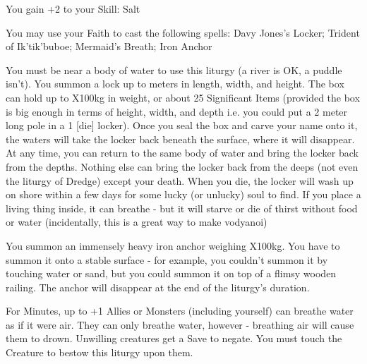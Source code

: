 {

You gain +2 to your Skill: Salt


You may use your Faith to cast the following spells: Davy Jones's Locker; Trident of Ik'tik'buboe; Mermaid's Breath; Iron Anchor

\LITURGY [
  Name= Davy Jones-Locker,
  Link= ikitikbubuoe-liturgy-davy-jones-locker,
  Paradigm= Prophesy ,
  Save=  N ,
  Duration= 0 ,
  Counter=  n/a  ,
  Keywords= None ,
  Target=   Close body of water
]



You must be near a body of water to use this liturgy (a river is OK, a puddle isn't).  You summon a lock up to \DICE meters in length, width, and height.  The box can hold up to \DICE X100kg in weight, or about 25 Significant Items (provided the box is big enough in terms of height, width, and depth i.e. you could put a 2 meter long pole in a 1 [die] locker).  Once you seal the box and carve your name onto it, the waters will take the locker back beneath the surface, where it will disappear.  At any time, you can return to the same body of water and bring the locker back from the depths. Nothing else can bring the locker back from the deeps (not even the liturgy of Dredge) except your death.  When you die, the locker will wash up on shore within a few days for some lucky (or unlucky) soul to find.
If you place a living thing inside, it can breathe - but it will starve or die of thirst without food or water (incidentally, this is a great way to make vodyanoi)
\LITURGY [
  Name= Iron Anchor,
  Link=ikitikbubuoe-liturgy-liturgy-iron-anchor,
  Paradigm= Force ,
  Save=  N ,
  Duration= \SUMDICE Minutes ,
  Counter=  n/a  ,
  Keywords= None ,
  Target=   Close (touch)
]



You summon an immensely heavy iron anchor weighing \DICE X100kg.  You have to summon it onto a stable surface - for example, you couldn't summon it by touching water or sand, but you could summon it on top of a flimsy wooden railing.  The anchor will disappear at the end of the liturgy's duration.
\LITURGY [
  Name= Mermaid's Breath,
  Link=ikitikbubuoe-liturgy-liturgy-mermaids-breath,
  Paradigm= Biomancy ,
  Save=  Y (negates) ,
  Duration= \SUMDICE Minutes ,
  Counter=  n/a  ,
  Keywords= Splittable ,
  Target=   Self / Close (touch)
]



For \SUMDICE Minutes, up to \DICE+1 Allies or Monsters (including yourself) can breathe water as if it were air.  They can only breathe water, however - breathing air will cause them to drown. Unwilling creatures get a Save to negate.  You must touch the Creature to bestow this liturgy upon them. 
\LITURGY [
  Name= Trident of Ik'tik'buboe,
  Link=ikitikbubuoe-liturgy-trident,
  Paradigm= Force ,
  Save=  N ,
  Duration= Session ,
  Counter=  n/a  ,
  Keywords= None ,
  Target=   Self
]



}
